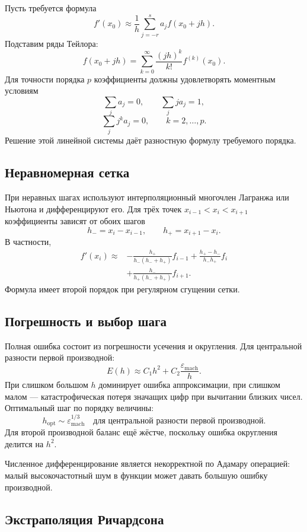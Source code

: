 Пусть требуется формула
\[
    f'(x_0)\approx\frac1h\sum_{j=-r}^{s}a_jf(x_0+jh).
\]
Подставим ряды Тейлора:
\[
    f(x_0+jh)=
    \sum_{k=0}^{\infty}\frac{(jh)^k}{k!}f^{(k)}(x_0).
\]
Для точности порядка $p$ коэффициенты должны удовлетворять моментным условиям
\[
    \sum_j a_j=0,
    \qquad
    \sum_j ja_j=1,
\]
\[
    \sum_j j^ka_j=0,
    \qquad k=2,\ldots,p.
\]
Решение этой линейной системы даёт разностную формулу требуемого порядка.

\subsection{Неравномерная сетка}

При неравных шагах используют интерполяционный многочлен Лагранжа или Ньютона и
дифференцируют его. Для трёх точек $x_{i-1}<x_i<x_{i+1}$ коэффициенты зависят от
обоих шагов
\[
    h_-=x_i-x_{i-1},
    \qquad
    h_+=x_{i+1}-x_i.
\]
В частности,
\[
\begin{aligned}
f'(x_i)\approx
&-\frac{h_+}{h_-(h_-+h_+)}f_{i-1}
+\frac{h_+-h_-}{h_-h_+}f_i\\
&+\frac{h_-}{h_+(h_-+h_+)}f_{i+1}.
\end{aligned}
\]
Формула имеет второй порядок при регулярном сгущении сетки.

\subsection{Погрешность и выбор шага}

Полная ошибка состоит из погрешности усечения и округления. Для центральной
разности первой производной:
\[
    E(h)\approx C_1h^2+C_2\frac{\varepsilon_{\mathrm{mach}}}{h}.
\]
При слишком большом $h$ доминирует ошибка аппроксимации, при слишком малом ---
катастрофическая потеря значащих цифр при вычитании близких чисел. Оптимальный
шаг по порядку величины:
\[
    h_{\mathrm{opt}}\sim\varepsilon_{\mathrm{mach}}^{1/3}
    \quad\text{для центральной разности первой производной}.
\]
Для второй производной баланс ещё жёстче, поскольку ошибка округления делится на
$h^2$.

Численное дифференцирование является некорректной по Адамару операцией: малый
высокочастотный шум в функции может давать большую ошибку производной.

\subsection{Экстраполяция Ричардсона}

